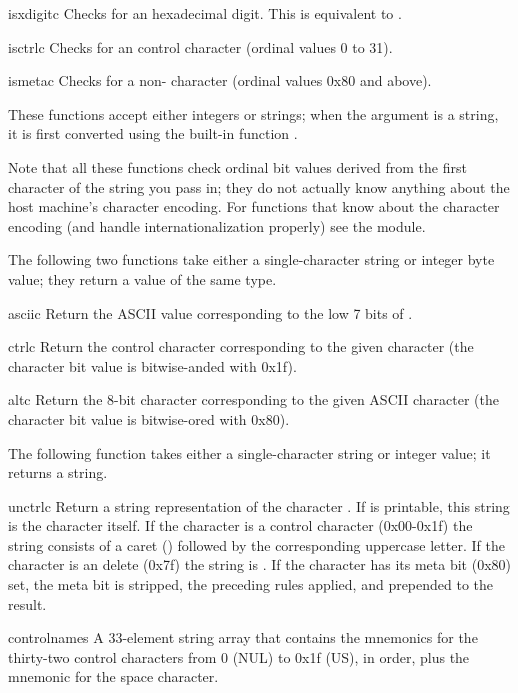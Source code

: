 \begin{funcdesc}{isxdigit}{c}
Checks for an \ASCII{} hexadecimal digit.  This is equivalent to
.
\end{funcdesc}

\begin{funcdesc}{isctrl}{c}
Checks for an \ASCII{} control character (ordinal values 0 to 31).
\end{funcdesc}

\begin{funcdesc}{ismeta}{c}
Checks for a non-\ASCII{} character (ordinal values 0x80 and above).
\end{funcdesc}

These functions accept either integers or strings; when the argument
is a string, it is first converted using the built-in function
.

Note that all these functions check ordinal bit values derived from the 
first character of the string you pass in; they do not actually know
anything about the host machine's character encoding.  For functions 
that know about the character encoding (and handle
internationalization properly) see the  module.

The following two functions take either a single-character string or
integer byte value; they return a value of the same type.

\begin{funcdesc}{ascii}{c}
Return the ASCII value corresponding to the low 7 bits of .
\end{funcdesc}

\begin{funcdesc}{ctrl}{c}
Return the control character corresponding to the given character
(the character bit value is bitwise-anded with 0x1f).
\end{funcdesc}

\begin{funcdesc}{alt}{c}
Return the 8-bit character corresponding to the given ASCII character
(the character bit value is bitwise-ored with 0x80).
\end{funcdesc}

The following function takes either a single-character string or
integer value; it returns a string.

\begin{funcdesc}{unctrl}{c}
Return a string representation of the \ASCII{} character .  If
 is printable, this string is the character itself.  If the
character is a control character (0x00-0x1f) the string consists of a
caret (\character{\^}) followed by the corresponding uppercase letter.
If the character is an \ASCII{} delete (0x7f) the string is
.  If the character has its meta bit (0x80) set, the meta
bit is stripped, the preceding rules applied, and
\character{!} prepended to the result.
\end{funcdesc}

\begin{datadesc}{controlnames}
A 33-element string array that contains the \ASCII{} mnemonics for the
thirty-two \ASCII{} control characters from 0 (NUL) to 0x1f (US), in
order, plus the mnemonic  for the space character.
\end{datadesc}
